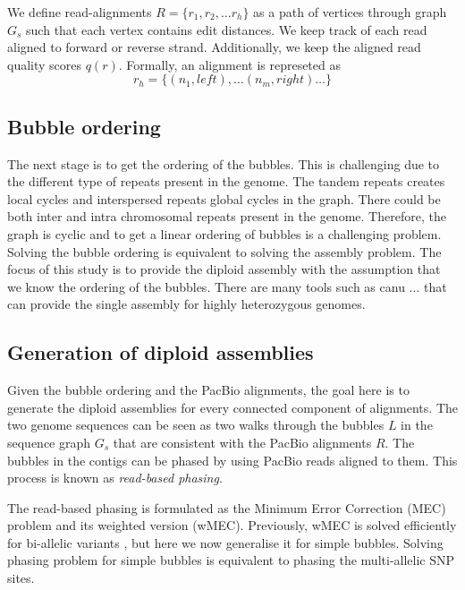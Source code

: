 \begin{definition}[Alignment]
We define read-alignments $R=\{r_1, r_2, \ldots r_h\}$ as a path of vertices through graph $G_s$ such that each vertex contains edit distances. We keep track of each read aligned to forward or reverse strand. Additionally, we keep the aligned read quality scores $q(r)$. 
Formally, an alignment is represeted as 
\[r_h=\{(n_1,left), \ldots (n_m,right) \ldots \}\] 
 
\end{definition}

\subsection{Bubble ordering}
The next stage is to get the ordering of the bubbles. This is challenging due to the different type of repeats present in the genome. 
The tandem repeats creates local cycles and interspersed repeats global cycles in the graph.
There could be both inter and intra chromosomal repeats present in the genome.
Therefore, the graph is cyclic and to get a linear ordering of bubbles is a challenging problem. 
Solving the bubble ordering is equivalent to solving the assembly problem. The focus of this study is to provide the diploid assembly with the assumption that we know the ordering of the bubbles.
There are many tools such as canu ... \citep{...} that can provide the single assembly for highly heterozygous genomes.

\subsection{Generation of diploid assemblies} 
Given the bubble ordering and the PacBio alignments, the goal here is to generate the diploid assemblies for every connected component of alignments.
The two genome sequences can be seen as two walks through the bubbles $L$ in the sequence graph $G_s$ that are consistent with the PacBio alignments $R$.
The bubbles in the contigs can be phased by using PacBio reads aligned to them. This process is known as \textit{read-based phasing}.

The read-based phasing is formulated as the Minimum Error Correction (MEC) problem \citep{ ...} and its weighted version (wMEC).
Previously, wMEC is solved efficiently for bi-allelic variants \citep{ ...}, but here we now generalise it for simple bubbles. Solving phasing problem for simple bubbles is equivalent to phasing the multi-allelic SNP sites.

